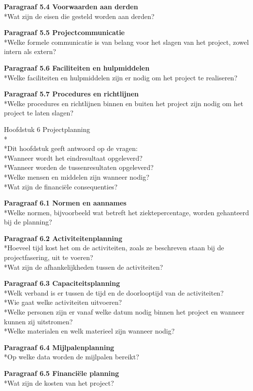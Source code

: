 \documentclass{article}
\begin{document}
\noindent
\textbf{Paragraaf 5.4 Voorwaarden aan derden}
\\*Wat zijn de eisen die gesteld worden aan derden?
\newline

\noindent
\textbf{Paragraaf 5.5 Projectcommunicatie}
\\*Welke formele communicatie is van belang voor het slagen van het project, zowel intern als extern?
\newline

\noindent
\textbf{Paragraaf 5.6 Faciliteiten en hulpmiddelen}
\\*Welke faciliteiten en hulpmiddelen zijn er nodig om het project te realiseren?
\newline

\noindent
\textbf{Paragraaf 5.7 Procedures en richtlijnen}
\\*Welke procedures en richtlijnen binnen en buiten het project zijn nodig om het project te laten slagen?
\newline
\newline

Hoofdstuk 6 Projectplanning
\\*
\\*Dit hoofdstuk geeft antwoord op de vragen:
\\*Wanneer wordt het eindresultaat opgeleverd?
\\*Wanneer worden de tussenresultaten opgeleverd?
\\*Welke mensen en middelen zijn wanneer nodig?
\\*Wat zijn de financiële consequenties?
\newline

\noindent
\textbf{Paragraaf 6.1 Normen en aannames}
\\*Welke normen, bijvoorbeeld wat betreft het ziektepercentage, worden gehanteerd bij de planning?
\newline

\noindent
\textbf{Paragraaf 6.2 Activiteitenplanning}
\\*Hoeveel tijd kost het om de activiteiten, zoals ze beschreven staan bij de projectfasering, uit te voeren?
\\*Wat zijn de afhankelijkheden tussen de activiteiten?
\newline

\noindent
\textbf{Paragraaf 6.3 Capaciteitsplanning}
\\*Welk verband is er tussen de tijd en de doorlooptijd van de activiteiten?
\\*Wie gaat welke activiteiten uitvoeren?
\\*Welke personen zijn er vanaf welke datum nodig binnen het project en wanneer kunnen zij uitstromen?
\\*Welke materialen en welk materieel zijn wanneer nodig?
\newline

\noindent
\textbf{Paragraaf 6.4 Mijlpalenplanning}
\\*Op welke data worden de mijlpalen bereikt?
\newline

\noindent
\textbf{Paragraaf 6.5 Financiële planning}
\\*Wat zijn de kosten van het project?
\end{document}
